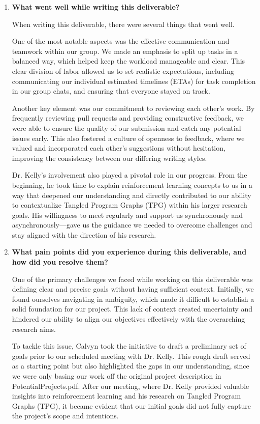 \documentclass{article}
\begin{document}
\begin{enumerate}
    \item \textbf{What went well while writing this deliverable?}
    
    When writing this deliverable, there were several things that went well. 

    One of the most notable aspects was the effective communication and teamwork within our group. We made an emphasis to split up tasks in a balanced way, which helped keep the workload manageable and clear. This clear division of labor allowed us to set realistic expectations, including communicating our individual estimated timelines (ETAs) for task completion in our group chats, and ensuring that everyone stayed on track.
    
    Another key element was our commitment to reviewing each other’s work. By frequently reviewing pull requests and providing constructive feedback, we were able to ensure the quality of our submission and catch any potential issues early. This also fostered a culture of openness to feedback, where we valued and incorporated each other's suggestions without hesitation, improving the consistency between our differing writing styles.
    
    Dr. Kelly's involvement also played a pivotal role in our progress. From the beginning, he took time to explain reinforcement learning concepts to us in a way that deepened our understanding and directly contributed to our ability to contextualize Tangled Program Graphs (TPG) within his larger research goals. His willingness to meet regularly and support us synchronously and asynchronously—gave us the guidance we needed to overcome challenges and stay aligned with the direction of his research.    
    
    \item \textbf{What pain points did you experience during this deliverable, and how
    did you resolve them?}

    One of the primary challenges we faced while working on this deliverable was defining clear and precise goals without having sufficient context. Initially, we found ourselves navigating in ambiguity, which made it difficult to establish a solid foundation for our project. This lack of context created uncertainty and hindered our ability to align our objectives effectively with the overarching research aims. 
    
    To tackle this issue, Calvyn took the initiative to draft a preliminary set of goals prior to our scheduled meeting with Dr. Kelly. This rough draft served as a starting point but also highlighted the gaps in our understanding, since we were only basing our work off the original project description in PotentialProjects.pdf. After our meeting, where Dr. Kelly provided valuable insights into reinforcement learning and his research on Tangled Program Graphs (TPG), it became evident that our initial goals did not fully capture the project's scope and intentions. 
    

\end{enumerate}
\end{document}
